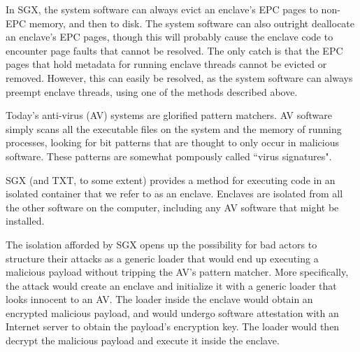 In SGX, the system software can always evict an enclave's EPC pages to non-EPC
memory, and then to disk. The system software can also outright deallocate an
enclave's EPC pages, though this will probably cause the enclave code to
encounter page faults that cannot be resolved. The only catch is that the EPC
pages that hold metadata for running enclave threads cannot be evicted or
removed. However, this can easily be resolved, as the system software can
always preempt enclave threads, using one of the methods described above.

%


\label{sec:sgx_enclaves_vs_av}

Today's anti-virus (AV) systems are glorified pattern matchers. AV software
simply scans all the executable files on the system and the memory of running
processes, looking for bit patterns that are thought to only occur in malicious
software. These patterns are somewhat pompously called ``virus signatures".

SGX (and TXT, to some extent) provides a method for executing code in an
isolated container that we refer to as an enclave. Enclaves are isolated from
all the other software on the computer, including any AV software that might be
installed.

The isolation afforded by SGX opens up the possibility for bad actors to
structure their attacks as a generic loader that would end up executing a
malicious payload without tripping the AV's pattern matcher.  More
specifically, the attack would create an enclave and initialize it with a
generic loader that looks innocent to an AV. The loader inside the enclave
would obtain an encrypted malicious payload, and would undergo software
attestation with an Internet server to obtain the payload's encryption key. The
loader would then decrypt the malicious payload and execute it inside the
enclave.

